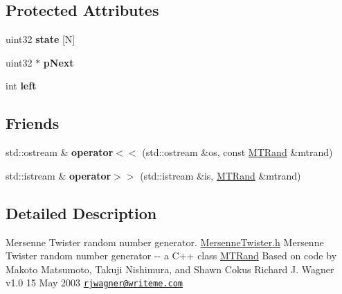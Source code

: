 \subsection*{Protected Attributes}
\begin{DoxyCompactItemize}
\item 
\hypertarget{class_m_t_rand_a2c87f537429bf0b0f6a452c22b9eebba}{
uint32 {\bfseries state} \mbox{[}N\mbox{]}}
\label{class_m_t_rand_a2c87f537429bf0b0f6a452c22b9eebba}

\item 
\hypertarget{class_m_t_rand_a2b80858137c88fe69d4d2bdc665bcf93}{
uint32 $\ast$ {\bfseries pNext}}
\label{class_m_t_rand_a2b80858137c88fe69d4d2bdc665bcf93}

\item 
\hypertarget{class_m_t_rand_a98eabf568c88f121e44f487397f32495}{
int {\bfseries left}}
\label{class_m_t_rand_a98eabf568c88f121e44f487397f32495}

\end{DoxyCompactItemize}
\subsection*{Friends}
\begin{DoxyCompactItemize}
\item 
\hypertarget{class_m_t_rand_a059061d50a1e54ee3067d4e1dbdd7c64}{
std::ostream \& {\bfseries operator$<$$<$} (std::ostream \&os, const \hyperlink{class_m_t_rand}{MTRand} \&mtrand)}
\label{class_m_t_rand_a059061d50a1e54ee3067d4e1dbdd7c64}

\item 
\hypertarget{class_m_t_rand_a45b02a702835a3be42171c5c2dc79b2d}{
std::istream \& {\bfseries operator$>$$>$} (std::istream \&is, \hyperlink{class_m_t_rand}{MTRand} \&mtrand)}
\label{class_m_t_rand_a45b02a702835a3be42171c5c2dc79b2d}

\end{DoxyCompactItemize}


\subsection{Detailed Description}
Mersenne Twister random number generator. \hyperlink{_mersenne_twister_8h_source}{MersenneTwister.h} Mersenne Twister random number generator -\/-\/ a C++ class \hyperlink{class_m_t_rand}{MTRand} Based on code by Makoto Matsumoto, Takuji Nishimura, and Shawn Cokus Richard J. Wagner v1.0 15 May 2003 \href{mailto:rjwagner@writeme.com}{\tt rjwagner@writeme.com}


